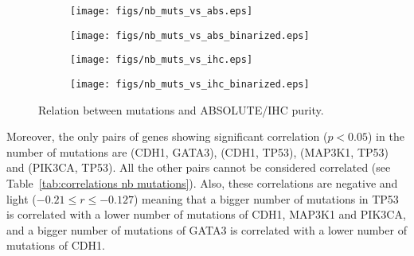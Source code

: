 \documentclass[letterpaper]{article}
\begin{document}
\begin{figure*}[!t]
\begin{subfigure}{.49\textwidth}
\texttt{[image: figs/nb\_muts\_vs\_abs.eps]}
\vspace{-1cm}
\end{subfigure}
\begin{subfigure}{.49\textwidth}
\texttt{[image: figs/nb\_muts\_vs\_abs\_binarized.eps]}
\vspace{-1cm}
\end{subfigure}
\begin{subfigure}{.49\textwidth}
\texttt{[image: figs/nb\_muts\_vs\_ihc.eps]}
\vspace{-1cm}
\end{subfigure}
\begin{subfigure}{.49\textwidth}
\texttt{[image: figs/nb\_muts\_vs\_ihc\_binarized.eps]}
\vspace{-1cm}
\end{subfigure}
\caption{Relation between mutations and ABSOLUTE/IHC purity.}
\end{figure*}

Moreover, the only pairs of genes showing significant correlation ($p < 0.05$) in the number of mutations are (CDH1, GATA3), (CDH1, TP53), (MAP3K1, TP53)
and (PIK3CA, TP53). All the other pairs cannot be considered correlated (see Table~\ref{tab:correlations nb mutations}). Also, these correlations are negative and light
($-0.21 \leq r \leq -0.127$) meaning that a bigger number of mutations in TP53 is correlated with a lower number of mutations of CDH1, MAP3K1 and PIK3CA, and a
bigger number of mutations of GATA3 is correlated with a lower number of mutations of CDH1.
\end{document}
